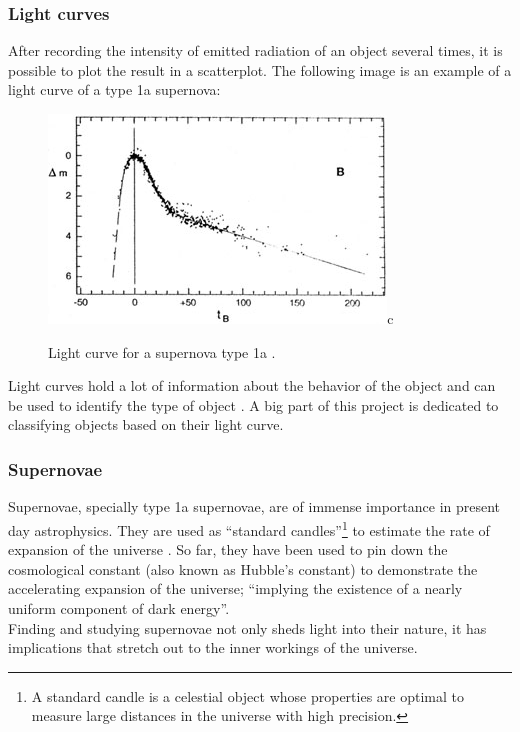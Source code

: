 \subsubsection{Light curves}

After recording the intensity of emitted radiation of an object several times, it is possible to plot the result in a scatterplot. The following image is an example of a light curve of a type 1a supernova:

\begin{figure}[H]
  \centering
  \includegraphics[width=0.8\textwidth]{snlightcurve.jpeg}c
  \caption{Light curve for a supernova type 1a \cite{snlightcurve}.}
\end{figure}

Light curves hold a lot of information about the behavior of the object and can be used to identify the type of object \cite{lc1,lc2}. A big part of this project is dedicated to classifying objects based on their light curve. 

\subsubsection{Supernovae}

Supernovae, specially type 1a supernovae, are of immense importance in present day astrophysics. They are used as ``standard candles''\footnote{A standard candle is a celestial object whose properties are optimal to measure large distances in the universe with high precision. } to estimate the rate of expansion of the universe \cite{expansion}. So far, they have been used to pin down the cosmological constant (also known as Hubble's constant) to demonstrate the accelerating expansion of the universe; ``implying the existence of a nearly uniform component of dark energy''\cite{darkEnergy}.\\

Finding and studying supernovae not only sheds light into their nature, it has implications that stretch out to the inner workings of the universe.

